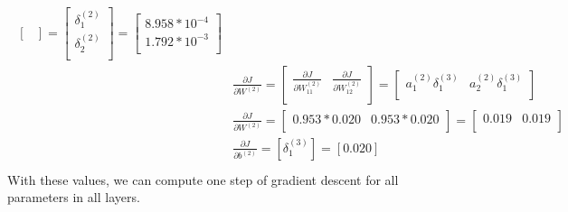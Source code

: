 \documentclass[leqno]{article}
\begin{document}
\begin{gather*}
\begin{split}
\begin{bmatrix}
  \end{bmatrix}
  =
 \begin{bmatrix}
   \delta_1^{(2)}\\ 
   \delta_2^{(2)}\\
  \end{bmatrix}
  =
  \begin{bmatrix}
   8.958*10^{-4}\\ 
   1.792*10^{-3}\\
  \end{bmatrix}
\\
&\frac{\partial J}{\partial W^{(2)}} = 
 \begin{bmatrix}
   \frac{\partial J}{\partial W_{11}^{(2)}} & \frac{\partial J}{\partial W_{12}^{(2)}}\\ 
  \end{bmatrix}
  =
 \begin{bmatrix}
   a_1^{(2)}\delta_1^{(3)} & a_2^{(2)}\delta_1^{(3)}\\ 
  \end{bmatrix}
\\
&\frac{\partial J}{\partial W^{(2)}}   =
  \begin{bmatrix}
   0.953*0.020 & 0.953*0.020\\ 
  \end{bmatrix}
  =
  \begin{bmatrix}
   0.019 & 0.019\\
  \end{bmatrix}
\\
&\frac{\partial J}{\partial b^{(2)}} = [\delta_1^{(3)}] = [0.020]\\
\end{split}
\end{gather*}
With these values, we can compute one step of gradient descent for all parameters in all layers.
\end{document}
